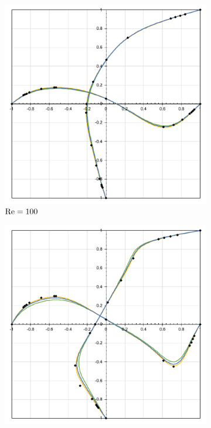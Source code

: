 \begin{figure}[h]
    \centering
    \caption{Valores do campo de velocidades sobre as linhas médias da cavidade.}
    \begin{subfigure}{0.4\textwidth}
    \includegraphics[width=\linewidth]{Figuras/Cavity/Re100.pdf}
    \caption{$\mathrm{Re}=100$}
    \end{subfigure}
    \begin{subfigure}{0.4\textwidth}
    \includegraphics[width=\linewidth]{Figuras/Cavity/Re400.pdf}

\end{subfigure}
\end{figure}
